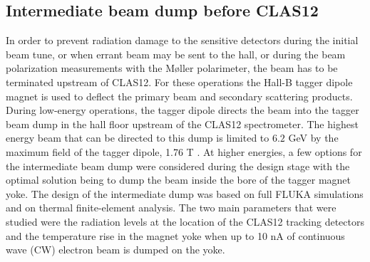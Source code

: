 \subsection{Intermediate beam dump before CLAS12}
\label{sec-IBD}

In order to prevent radiation damage to the sensitive detectors during the initial beam tune, or when errant beam may be sent to the hall, 
or during the beam polarization measurements with the M{\o}ller polarimeter, the beam has to be terminated upstream of CLAS12. For these 
operations the Hall-B tagger dipole magnet is used to deflect the primary beam and secondary scattering products. During low-energy 
operations, the tagger dipole directs the beam into the tagger beam dump in the hall floor upstream of the CLAS12 spectrometer. The highest 
energy beam that can be directed to this dump is limited to $6.2$ GeV by the maximum field of the tagger dipole, 
1.76 T \cite{tagger}. At higher energies, a few options for the intermediate beam dump were considered during the design stage with 
the optimal solution being to dump the beam inside the bore of the tagger magnet yoke. The design of the intermediate dump was based on
full FLUKA \cite{fluka} simulations and on thermal finite-element analysis. The two main parameters that were studied were the radiation levels at 
the location of the CLAS12 tracking detectors and the temperature rise in the magnet yoke when up to 10 nA of continuous wave (CW) 
electron beam is dumped on the yoke.  

